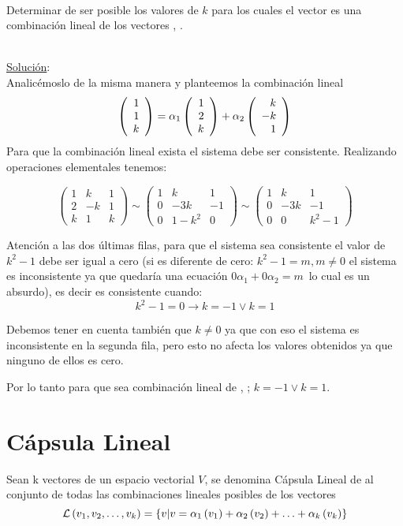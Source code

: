 ~\\
\begin{ejercicio}
Determinar de ser posible los valores de $k$ para los cuales el vector 
 es una combinaci\'on lineal de los vectores
 , .
\end{ejercicio}
~\\
\underline{Soluci\'on}:
\\
Analic\'emoslo de la misma manera y planteemos la combinaci\'on lineal
\[
\left( \begin{array}{r} 1\\ 1\\ k \end{array} \right) =
 \alpha_1\left( \begin{array}{r} 1\\ 2\\ k \end{array} \right) +\alpha_2\left( \begin{array}{r} k\\ -k\\ 1 \end{array} \right) 
\]
Para que la combinaci\'on lineal exista el sistema debe ser consistente. Realizando operaciones elementales tenemos:

\[
\left(
\begin{array}{rr|r}
1 &k&1\\
2&-k&1\\
k&1&k
\end{array}
\right)
\sim
\left(
\begin{array}{rr|r}
1 &k&1\\
0&-3k&-1\\
0&1-k^2&0
\end{array}
\right)
\sim
\left(
\begin{array}{rr|r}
1 &k&1\\
0&-3k&-1\\
0&0&k^2-1
\end{array}
\right)
\]

Atenci\'on a las dos \'ultimas filas, para que el sistema sea consistente el valor de $k^2-1$ debe ser igual a cero (si es diferente de cero: $k^2-1=m, m\neq 0$ el sistema es inconsistente ya que quedar\'ia una ecuaci\'on $0\alpha_1+0\alpha_2=m$\, lo cual es un absurdo), es decir es consistente cuando:
\[k^2-1=0  \longrightarrow  k=-1 \vee k=1\]

Debemos tener en cuenta también que $k\neq 0$
ya que con eso el sistema es inconsistente en la
segunda fila, pero esto no afecta los valores obtenidos ya que ninguno de ellos es cero.


Por lo tanto para que  sea combinaci\'on lineal de , ; $k=-1 \vee k=1$.

\newpage
\section{Cápsula Lineal}
\begin{dfn}
Sean  k vectores de un espacio vectorial $V$, se denomina C\'apsula Lineal de  al conjunto de todas las combinaciones lineales posibles de los vectores 
\[
\mathcal{L} \left( v_1, v_2, \ldots, v_k\right)=
\lbrace v|v= \alpha_1\left(v_1\right) +
 \alpha_2\left(v_2\right) +
\ldots+
 \alpha_k\left(v_k\right) 
\rbrace
\]

\end{dfn}

